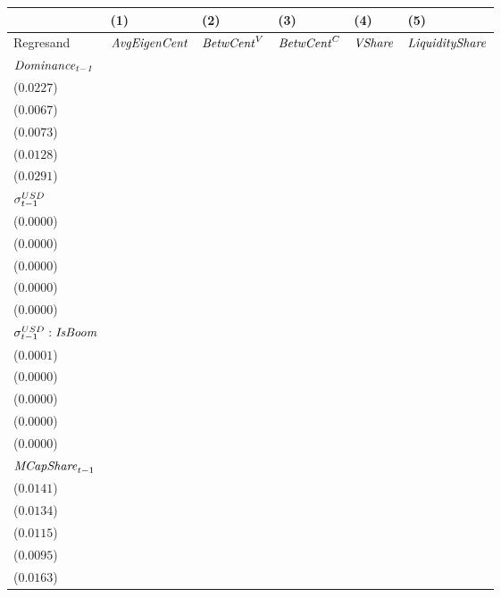 \begin{tabular}{llllll}
\toprule
{} &                                       (1) &                                       (2) &                                       (3) &                                       (4) &                                       (5) \\
\midrule
Regresand                               &                      ${\it AvgEigenCent}$ &                        ${\it BetwCent}^V$ &                        ${\it BetwCent}^C$ &                            ${\it VShare}$ &                    ${\it LiquidityShare}$ \\
$\it Dominance_{t-1}$                   &   \makecell{$0.8349^{***}$ \\ ($0.0227$)} &   \makecell{$0.9507^{***}$ \\ ($0.0067$)} &   \makecell{$0.9515^{***}$ \\ ($0.0073$)} &   \makecell{$0.8831^{***}$ \\ ($0.0128$)} &   \makecell{$0.9222^{***}$ \\ ($0.0291$)} \\
${\it \sigma}^{USD}_{t-1}$              &   \makecell{$-0.0001^{**}$ \\ ($0.0000$)} &      \makecell{$0.0000^{}$ \\ ($0.0000$)} &      \makecell{$0.0000^{}$ \\ ($0.0000$)} &   \makecell{$-0.0000^{**}$ \\ ($0.0000$)} &   \makecell{$-0.0000^{**}$ \\ ($0.0000$)} \\
${\it \sigma}^{USD}_{t-1}:{\it IsBoom}$ &   \makecell{$0.0002^{***}$ \\ ($0.0001$)} &     \makecell{$-0.0000^{}$ \\ ($0.0000$)} &     \makecell{$-0.0000^{}$ \\ ($0.0000$)} &   \makecell{$0.0000^{***}$ \\ ($0.0000$)} &    \makecell{$0.0000^{**}$ \\ ($0.0000$)} \\
${\it MCapShare}_{t-1}$                 &      \makecell{$0.0124^{}$ \\ ($0.0141$)} &    \makecell{$0.0333^{**}$ \\ ($0.0134$)} &   \makecell{$0.0360^{***}$ \\ ($0.0115$)} &   \makecell{$0.0311^{***}$ \\ ($0.0095$)} &   \makecell{$0.0429^{***}$ \\ ($0.0163$)} \\

\end{tabular}
